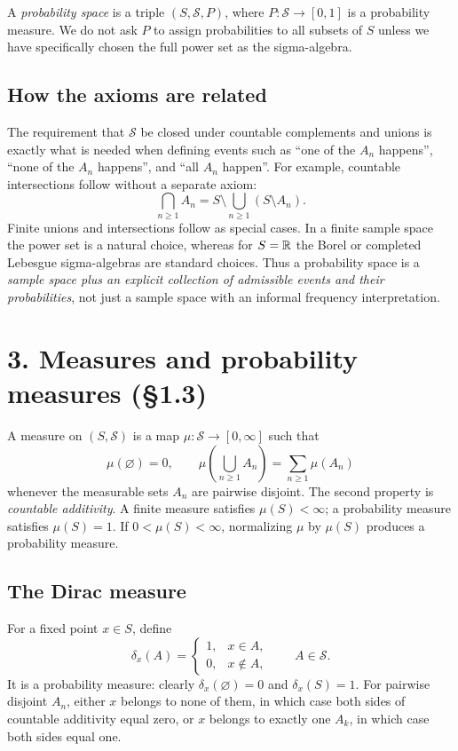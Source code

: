 \documentclass[10pt,a4paper]{article}
\begin{document}
A \emph{probability space} is a triple $(S,\mathcal S,P)$, where $P:\mathcal S\to[0,1]$ is a probability measure. We do not ask $P$ to assign probabilities to all subsets of $S$ unless we have specifically chosen the full power set as the sigma-algebra.


\subsection*{How the axioms are related}
The requirement that $\mathcal S$ be closed under countable complements and unions is exactly what is needed when defining events such as ``one of the $A_n$ happens'', ``none of the $A_n$ happens'', and ``all $A_n$ happen''. For example, countable intersections follow without a separate axiom:
\[
\bigcap_{n\ge1}A_n
=S\setminus\bigcup_{n\ge1}(S\setminus A_n).
\]
Finite unions and intersections follow as special cases. In a finite sample space the power set is a natural choice, whereas for $S=\mathbb R$ the Borel or completed Lebesgue sigma-algebras are standard choices. Thus a probability space is a \emph{sample space plus an explicit collection of admissible events and their probabilities}, not just a sample space with an informal frequency interpretation.

\section*{3. Measures and probability measures (\S1.3)}
A measure on $(S,\mathcal S)$ is a map $\mu:\mathcal S\to[0,\infty]$ such that
\[
\mu(\varnothing)=0,
\qquad
\mu\left(\bigcup_{n\ge1}A_n\right)=\sum_{n\ge1}\mu(A_n)
\]
whenever the measurable sets $A_n$ are pairwise disjoint. The second property is \emph{countable additivity}. A finite measure satisfies $\mu(S)<\infty$; a probability measure satisfies $\mu(S)=1$. If $0<\mu(S)<\infty$, normalizing $\mu$ by $\mu(S)$ produces a probability measure.

\subsection*{The Dirac measure}
For a fixed point $x\in S$, define
\[
\delta_x(A)=\begin{cases}1,&x\in A,\\0,&x\notin A,\end{cases}
\qquad A\in\mathcal S.
\]
It is a probability measure: clearly $\delta_x(\varnothing)=0$ and $\delta_x(S)=1$. For pairwise disjoint $A_n$, either $x$ belongs to none of them, in which case both sides of countable additivity equal zero, or $x$ belongs to exactly one $A_k$, in which case both sides equal one.
\end{document}
